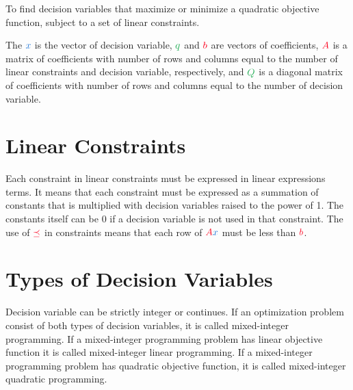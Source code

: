 \documentclass{article}
\begin{document}
To find \textcolor{var}{decision variables} that \textcolor{opt}{maximize or minimize} a \textcolor{obj}{quadratic objective function}, subject to a set of \textcolor{const}{linear constraints}.

The $\color{var} x$ is the vector of \textcolor{var}{decision variable}, $\color{obj} q$ and $\color{const} b$ are vectors of coefficients, $\color{const} A$ is a matrix of coefficients with number of rows and columns equal to the number of \textcolor{const}{linear constraints} and \textcolor{var}{decision variable}, respectively, and $\color{obj} Q$ is a diagonal matrix of coefficients with number of rows and columns equal to the number of \textcolor{var}{decision variable}.

\section{Linear Constraints}

Each \textcolor{const}{constraint} in \textcolor{const}{linear constraints} must be expressed in linear expressions terms. It means that each \textcolor{const}{constraint} must be expressed as a summation of \textcolor{const}{constants} that is multiplied with \textcolor{var}{decision variables} raised to the power of 1. The \textcolor{const}{constants} itself can be $0$ if a \textcolor{var}{decision variable} is not used in that \textcolor{const}{constraint}. The use of $\color{const} \preceq$ in \textcolor{const}{constraints} means that each row of $\color{const} A \color{var} x$ must be less than $\color{const} b$.

\section{Types of Decision Variables}

\textcolor{var}{Decision variable} can be strictly integer or continues. If an optimization problem consist of both types of \textcolor{var}{decision variables}, it is called \textcolor{var}{mixed-integer} programming. If a \textcolor{var}{mixed-integer} programming problem has \textcolor{obj}{linear objective function} it is called \textcolor{var}{mixed-integer} \textcolor{obj}{linear} programming. If a \textcolor{var}{mixed-integer} programming problem has \textcolor{obj}{quadratic objective function}, it is called \textcolor{var}{mixed-integer} \textcolor{obj}{quadratic} programming.
\end{document}
